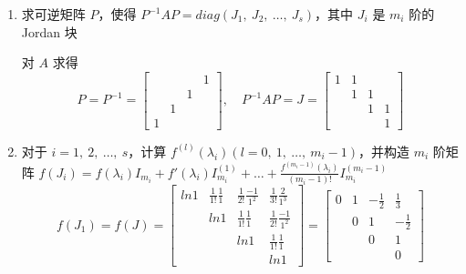             \begin{solution}
                \begin{enumerate}
                    \item 求可逆矩阵 $P$，使得 $P^{-1}AP = diag(J_1, \ J_2, \ \dots, \ J_s)$，其中 $J_i$ 是 $m_i$ 阶的 Jordan 块 
                        \par 对 $A$ 求得
                        \begin{equation*}
                            P = P^{-1} = \begin{bmatrix}
                                & & & 1 \\ & & 1 & \\ & 1 & & \\ 1 & & &
                            \end{bmatrix}, \quad P^{-1}AP = J = \begin{bmatrix}
                                1 & 1 & & \\ & 1 & 1 & \\ & & 1 & 1 \\ & & & 1
                            \end{bmatrix}
                        \end{equation*}
                    \item 对于 $i = 1, \ 2, \ \dots, \ s$，计算 $f^{(l)}(\lambda_i)(l = 0, \ 1, \ \dots, \ m_i - 1)$，并构造 $m_i$ 阶矩阵 $f(J_i) = f(\lambda_i)I_{m_i} + f'(\lambda_i)I_{m_i}^{(1)} + \dots + \frac{f^{(m_i-1)}(\lambda_i)}{(m_i - 1)!}I_{m_i}^{(m_i-1)}$
                        \begin{equation*}
                            f(J_1) = f(J) = \begin{bmatrix}
                                ln1 & \frac{1}{1!}\frac{1}{1} & \frac{1}{2!}\frac{-1}{1^2} & \frac{1}{3!}\frac{2}{1^3} \\ & ln1 & \frac{1}{1!}\frac{1}{1} & \frac{1}{2!}\frac{-1}{1^2} \\ & & ln1 & \frac{1}{1!}\frac{1}{1} \\ & & & ln1 
                            \end{bmatrix} = \begin{bmatrix}
                                0 & 1 & -\frac{1}{2} & \frac{1}{3} \\ & 0 & 1 & -\frac{1}{2} \\ & & 0 & 1 \\ & & & 0
                            \end{bmatrix}
                        \end{equation*}

\end{enumerate}
\end{solution}
